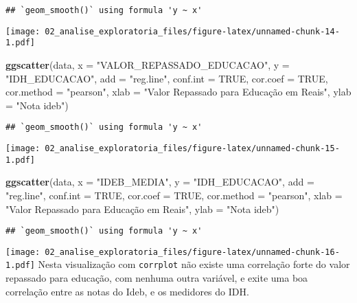 \documentclass[
]{article}
\newenvironment{Shaded}{\begin{snugshade}}{\end{snugshade}}
\newcommand{\DataTypeTok}[1]{\textcolor[rgb]{0.13,0.29,0.53}{#1}}
\newcommand{\KeywordTok}[1]{\textcolor[rgb]{0.13,0.29,0.53}{\textbf{#1}}}
\newcommand{\NormalTok}[1]{#1}
\newcommand{\OtherTok}[1]{\textcolor[rgb]{0.56,0.35,0.01}{#1}}
\newcommand{\StringTok}[1]{\textcolor[rgb]{0.31,0.60,0.02}{#1}}
\begin{document}
\begin{verbatim}
## `geom_smooth()` using formula 'y ~ x'
\end{verbatim}

\texttt{[image: 02\_analise\_exploratoria\_files/figure-latex/unnamed-chunk-14-1.pdf]}

\begin{Shaded}
\begin{Highlighting}[]
\KeywordTok{ggscatter}\NormalTok{(data, }\DataTypeTok{x =} \StringTok{"VALOR\_REPASSADO\_EDUCACAO"}\NormalTok{, }\DataTypeTok{y =} \StringTok{"IDH\_EDUCACAO"}\NormalTok{, }
          \DataTypeTok{add =} \StringTok{"reg.line"}\NormalTok{, }\DataTypeTok{conf.int =} \OtherTok{TRUE}\NormalTok{, }
          \DataTypeTok{cor.coef =} \OtherTok{TRUE}\NormalTok{, }\DataTypeTok{cor.method =} \StringTok{"pearson"}\NormalTok{,}
          \DataTypeTok{xlab =} \StringTok{"Valor Repassado para Educação em Reais"}\NormalTok{, }\DataTypeTok{ylab =} \StringTok{"Nota ideb"}\NormalTok{)}
\end{Highlighting}
\end{Shaded}

\begin{verbatim}
## `geom_smooth()` using formula 'y ~ x'
\end{verbatim}

\texttt{[image: 02\_analise\_exploratoria\_files/figure-latex/unnamed-chunk-15-1.pdf]}

\begin{Shaded}
\begin{Highlighting}[]
\KeywordTok{ggscatter}\NormalTok{(data, }\DataTypeTok{x =} \StringTok{"IDEB\_MEDIA"}\NormalTok{, }\DataTypeTok{y =} \StringTok{"IDH\_EDUCACAO"}\NormalTok{, }
          \DataTypeTok{add =} \StringTok{"reg.line"}\NormalTok{, }\DataTypeTok{conf.int =} \OtherTok{TRUE}\NormalTok{, }
          \DataTypeTok{cor.coef =} \OtherTok{TRUE}\NormalTok{, }\DataTypeTok{cor.method =} \StringTok{"pearson"}\NormalTok{,}
          \DataTypeTok{xlab =} \StringTok{"Valor Repassado para Educação em Reais"}\NormalTok{, }\DataTypeTok{ylab =} \StringTok{"Nota ideb"}\NormalTok{)}
\end{Highlighting}
\end{Shaded}

\begin{verbatim}
## `geom_smooth()` using formula 'y ~ x'
\end{verbatim}

\texttt{[image: 02\_analise\_exploratoria\_files/figure-latex/unnamed-chunk-16-1.pdf]}
Nesta visualização com \texttt{corrplot} não existe uma correlação forte
do valor repassado para educação, com nenhuma outra variável, e exite
uma boa correlação entre as notas do Ideb, e os medidores do IDH.
\end{document}
